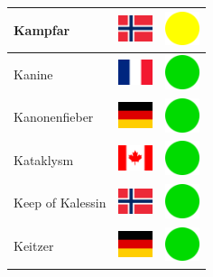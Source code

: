 \documentclass[12pt, a4paper, twoside]{report}
\begin{document}
\begin{center}
\begin{longtable}{|p{5cm}|p{2cm}|p{2cm}|}
 Kampfar                                                    & \includegraphics[width=1cm]{../4x3/no} &   \includegraphics[width=1cm]{../likes/m} \\ \hline
 Kanine                                                     & \includegraphics[width=1cm]{../4x3/fr} &   \includegraphics[width=1cm]{../likes/y} \\ \hline
 Kanonenfieber                                              & \includegraphics[width=1cm]{../4x3/de} &   \includegraphics[width=1cm]{../likes/y} \\ \hline
 Kataklysm                                                  & \includegraphics[width=1cm]{../4x3/ca} &   \includegraphics[width=1cm]{../likes/y} \\ \hline
 Keep of Kalessin                                           & \includegraphics[width=1cm]{../4x3/no} &   \includegraphics[width=1cm]{../likes/y} \\ \hline
 Keitzer                                                    & \includegraphics[width=1cm]{../4x3/de} &   \includegraphics[width=1cm]{../likes/y} \\ \hline

\end{longtable}
\end{center}
\end{document}
